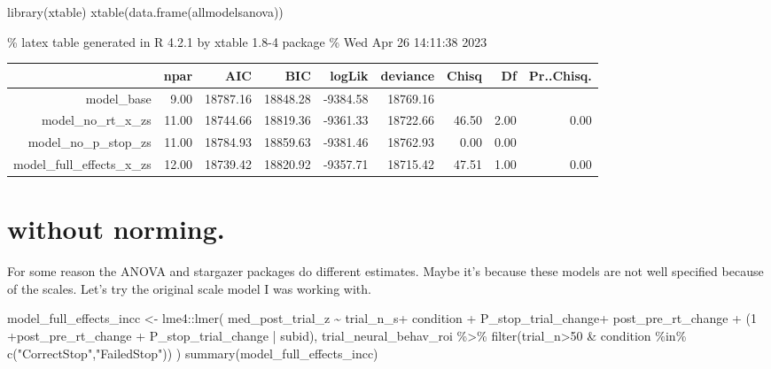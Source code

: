 \documentclass[
]{article}
\newenvironment{Shaded}{\begin{snugshade}}{\end{snugshade}}
\newcommand{\DecValTok}[1]{\textcolor[rgb]{0.00,0.00,0.81}{#1}}
\newcommand{\FunctionTok}[1]{\textcolor[rgb]{0.00,0.00,0.00}{#1}}
\newcommand{\NormalTok}[1]{#1}
\newcommand{\OtherTok}[1]{\textcolor[rgb]{0.56,0.35,0.01}{#1}}
\newcommand{\SpecialCharTok}[1]{\textcolor[rgb]{0.00,0.00,0.00}{#1}}
\newcommand{\StringTok}[1]{\textcolor[rgb]{0.31,0.60,0.02}{#1}}
\begin{document}
\begin{Shaded}
\begin{Highlighting}[]
\FunctionTok{library}\NormalTok{(xtable)}
\FunctionTok{xtable}\NormalTok{(}\FunctionTok{data.frame}\NormalTok{(allmodelsanova))}
\end{Highlighting}
\end{Shaded}

\% latex table generated in R 4.2.1 by xtable 1.8-4 package \% Wed Apr
26 14:11:38 2023

\begin{table}[ht]
\centering
\begin{tabular}{rrrrrrrrr}
  \hline
 & npar & AIC & BIC & logLik & deviance & Chisq & Df & Pr..Chisq. \\ 
  \hline
model\_base & 9.00 & 18787.16 & 18848.28 & -9384.58 & 18769.16 &  &  &  \\ 
  model\_no\_rt\_x\_zs & 11.00 & 18744.66 & 18819.36 & -9361.33 & 18722.66 & 46.50 & 2.00 & 0.00 \\ 
  model\_no\_p\_stop\_zs & 11.00 & 18784.93 & 18859.63 & -9381.46 & 18762.93 & 0.00 & 0.00 &  \\ 
  model\_full\_effects\_x\_zs & 12.00 & 18739.42 & 18820.92 & -9357.71 & 18715.42 & 47.51 & 1.00 & 0.00 \\ 
   \hline
\end{tabular}
\end{table}

\hypertarget{without-norming.}{%
\section{without norming.}\label{without-norming.}}

For some reason the ANOVA and stargazer packages do different estimates.
Maybe it's because these models are not well specified because of the
scales. Let's try the original scale model I was working with.

\begin{Shaded}
\begin{Highlighting}[]
\NormalTok{model\_full\_effects\_incc }\OtherTok{\textless{}{-}}\NormalTok{ lme4}\SpecialCharTok{::}\FunctionTok{lmer}\NormalTok{(}
\NormalTok{   med\_post\_trial\_z }\SpecialCharTok{\textasciitilde{}}\NormalTok{ trial\_n\_s}\SpecialCharTok{+}\NormalTok{ condition }\SpecialCharTok{+}\NormalTok{ P\_stop\_trial\_change}\SpecialCharTok{+}\NormalTok{ post\_pre\_rt\_change }\SpecialCharTok{+}\NormalTok{ (}\DecValTok{1} \SpecialCharTok{+}\NormalTok{post\_pre\_rt\_change  }\SpecialCharTok{+}\NormalTok{ P\_stop\_trial\_change  }\SpecialCharTok{|}\NormalTok{ subid),}
\NormalTok{  trial\_neural\_behav\_roi }\SpecialCharTok{\%\textgreater{}\%} \FunctionTok{filter}\NormalTok{(trial\_n}\SpecialCharTok{\textgreater{}}\DecValTok{50} \SpecialCharTok{\&}\NormalTok{ condition }\SpecialCharTok{\%in\%} \FunctionTok{c}\NormalTok{(}\StringTok{"CorrectStop"}\NormalTok{,}\StringTok{"FailedStop"}\NormalTok{))}
\NormalTok{  )}
\FunctionTok{summary}\NormalTok{(model\_full\_effects\_incc)}
\end{Highlighting}
\end{Shaded}
\end{document}
